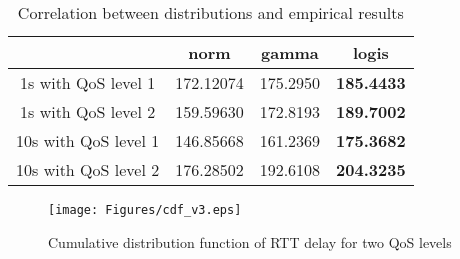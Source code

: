 %

\begin{table} [!htb]
\caption{Correlation between distributions and empirical results}
\centering
  \begin{tabular}{ | c | c | c | c | }
    \hline
	\                    & norm      & gamma    & logis         \\\hline 
	1s  with QoS level 1 & 172.12074 & 175.2950 & \bf{185.4433} \\\hline 
	1s  with QoS level 2 & 159.59630 & 172.8193 & \bf{189.7002} \\\hline 
	10s with QoS level 1 & 146.85668 & 161.2369 & \bf{175.3682} \\\hline 
	10s with QoS level 2 & 176.28502 & 192.6108 & \bf{204.3235} \\\hline
  \end{tabular}
\label{table:correlation}
\end{table}


\begin{figure}[!htb]
\centering
\texttt{[image: Figures/cdf\_v3.eps]}
\caption{Cumulative distribution function of RTT delay for two QoS levels}
\label{fig:cdf.pdf}
\end{figure}

